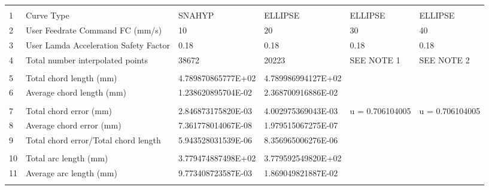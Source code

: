 

\begin{tabular}{ p{0.5cm} p{8.0cm} p{4.00cm} p{4.0cm} p{4.00cm} p{4.0cm}}
\hline
	&                                                      &                    &                      &                    & \\
1	& Curve Type	                                       & SNAHYP             & ELLIPSE	           & ELLIPSE            &	ELLIPSE \\
2	& User Feedrate Command FC (mm/s)                      &	10	            &    20                &	30	            &    40 \\
3	& User Lamda Acceleration Safety Factor	               &   0.18             &	0.18               &   0.18             &   0.18 \\
4	& Total number interpolated points	                   &   38672	        &  20223	           &  SEE NOTE 1	    & SEE NOTE 2\\
	&                                                      &                    &                      &    &  \\
5	& Total chord length (mm)	                           & 4.789870865777E+02	& 4.789986994127E+02   &    &  \\
6	& Average chord length (mm)	                           & 1.238620895704E-02	& 2.368700916886E-02   & 	&  \\
	&                                                      &                    &                      &    &  \\
7	& Total chord error (mm)	                           & 2.846873175820E-03	& 4.002975369043E-03   & u = 0.706104005     & u = 0.706104005\\
8	& Average chord error (mm)	                           & 7.361778014067E-08	& 1.979515067275E-07   & 	& \\
9	& Total chord error/Total chord length                 & 5.943528031539E-06	& 8.356965006276E-06   &    & \\
	&                                                      &                    &                      &    & \\
10	& Total arc length (mm)	                               & 3.779474887498E+02	& 3.779592549820E+02   &    & \\
11	& Average arc length (mm)	                           & 9.773408723587E-03	& 1.869049821887E-02   & 	& \\
	&                                                      &                    &                      &    & \\

\end{tabular}
